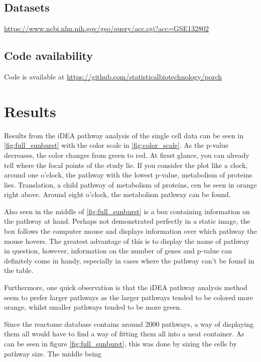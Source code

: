 \documentclass[11pt]{article}
\begin{document}
\subsection*{Datasets}
  \url{https://www.ncbi.nlm.nih.gov/geo/query/acc.cgi?acc=GSE132802}
\subsection*{Code availability}
  Code is available at \url{https://github.com/statisticalbiotechnology/porch}

\section*{Results}

  Results from the iDEA pathway analysis of the single cell data can be seen in \ref{fig:full_sunburst} with the color scale in \ref{fig:color_scale}. As the p-value decreases, the color changes from green to red. At firsst glance, you can already tell where the focal points of the study lie. If you consider the plot like a clock, around one o'clock, the pathway with the lowest p-value, metabolism of proteins \cite{reactome} lies. Translation, a child pathway of metabolism of proteins, cen be seen in orange right above. Around eight o'clock, the metabolism pathway can be found.

  Also seen in the middle of \ref{fig:full_sunburst} is a box containing information on the pathway at hand. Perhaps not demonstrated perfectly in a static image, the box follows the computer mouse and displays information over which pathway the mouse hovers. The greatest advantage of this is to display the name of pathway in question, however, information on the number of genes and p-value can definitely come in handy, especially in cases where the pathway can't be found in the table.

  Furthermore, one quick observation is that the iDEA pathway analysis method seem to prefer larger pathways as the larger pathways tended to be colored more orange, whilst smaller pathways tended to be more green.  


  Since the reactome database contains around 2000 pathways, a way of displaying them all would have to find a way of fitting them all into a neat container. As can be seen in figure \ref{fig:full_sunburst}, this was done by sizing the cells by pathway size. The middle being
\end{document}
